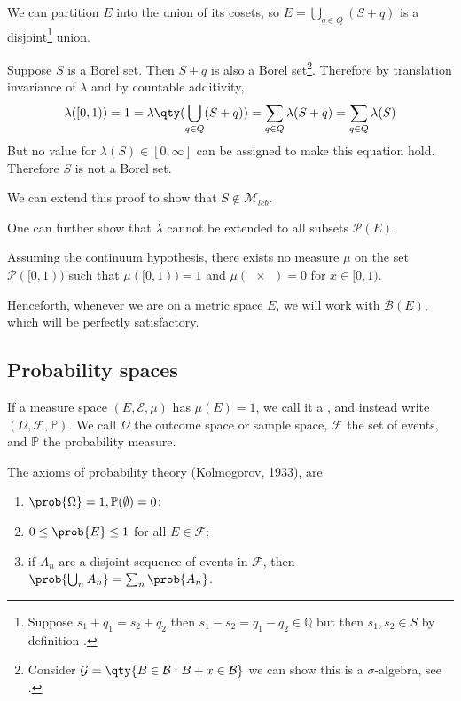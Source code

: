 We can partition $E$ into the union of its cosets, so $E = \bigcup_{q \in Q} (S + q)$ is a disjoint\footnote{Suppose $s_1 + q_1 = s_2 + q_2$ then $s_1 - s_2 = q_1 - q_2 \in \mathbb{Q}$ but then $s_1, s_2 \in S$ by definition \Lightning.} union.

Suppose $S$ is a Borel set.
Then $S + q$ is also a Borel set\footnote{Consider $\mathcal{G} = \qty{B \in \mathcal{B} : B + x \in \mathcal{B}}$ we can show this is a $\sigma$-algebra, see .}.
Therefore by translation invariance of $\lambda$ and by countable additivity,
\begin{align*}
	\lambda([0, 1)) = 1 = \lambda\qty(\bigcup_{q \in Q}(S+q)) = \sum_{q \in Q} \lambda(S+q) = \sum_{q \in Q} \lambda(S)
\end{align*}
But no value for $\lambda(S) \in [0,\infty]$ can be assigned to make this equation hold.
Therefore $S$ is not a Borel set.

\begin{remark}
	We can extend this proof to show that $S \notin \mathcal{M}_{leb}$.
\end{remark}

One can further show that $\lambda$ cannot be extended to all subsets $\mathcal P(E)$.
\begin{theorem}
	Assuming the continuum hypothesis, there exists no measure $\mu$ on the set $\mathcal P([0,1))$ such that $\mu([0,1)) = 1$ and $\mu(\qty{x}) = 0$ for $x \in [0,1)$.
\end{theorem}

Henceforth, whenever we are on a metric space $E$, we will work with $\mathcal{B}(E)$, which will be perfectly satisfactory.

\subsection{Probability spaces}

\begin{definition}
	If a measure space $(E, \mathcal E, \mu)$ has $\mu(E) = 1$, we call it a , and instead write $(\Omega, \mathcal F, \mathbb P)$.
	We call $\Omega$ the outcome space or sample space, $\mathcal F$ the set of events, and $\mathbb P$ the probability measure.
\end{definition}

The axioms of probability theory (Kolmogorov, 1933), are

\begin{enumerate}
	\item $\prob{\Omega} = 1, \mathbb{P}(\emptyset) = 0$;
	\item $0 \leq \prob{E} \leq 1$ for all $E \in \mathcal F$;
	\item if $A_n$ are a disjoint sequence of events in $\mathcal F$, then $\prob{\bigcup_n A_n} = \sum_n \prob{A_n}$.
\end{enumerate}


